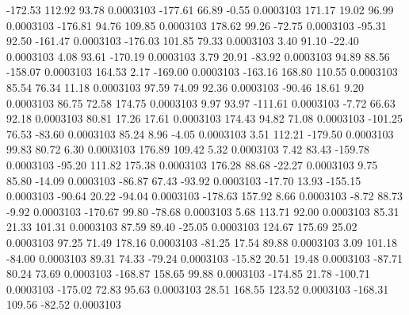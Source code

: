      -172.53      112.92       93.78     0.0003103
     -177.61       66.89       -0.55     0.0003103
      171.17       19.02       96.99     0.0003103
     -176.81       94.76      109.85     0.0003103
      178.62       99.26      -72.75     0.0003103
      -95.31       92.50     -161.47     0.0003103
     -176.03      101.85       79.33     0.0003103
        3.40       91.10      -22.40     0.0003103
        4.08       93.61     -170.19     0.0003103
        3.79       20.91      -83.92     0.0003103
       94.89       88.56     -158.07     0.0003103
      164.53        2.17     -169.00     0.0003103
     -163.16      168.80      110.55     0.0003103
       85.54       76.34       11.18     0.0003103
       97.59       74.09       92.36     0.0003103
      -90.46       18.61        9.20     0.0003103
       86.75       72.58      174.75     0.0003103
        9.97       93.97     -111.61     0.0003103
       -7.72       66.63       92.18     0.0003103
       80.81       17.26       17.61     0.0003103
      174.43       94.82       71.08     0.0003103
     -101.25       76.53      -83.60     0.0003103
       85.24        8.96       -4.05     0.0003103
        3.51      112.21     -179.50     0.0003103
       99.83       80.72        6.30     0.0003103
      176.89      109.42        5.32     0.0003103
        7.42       83.43     -159.78     0.0003103
      -95.20      111.82      175.38     0.0003103
      176.28       88.68      -22.27     0.0003103
        9.75       85.80      -14.09     0.0003103
      -86.87       67.43      -93.92     0.0003103
      -17.70       13.93     -155.15     0.0003103
      -90.64       20.22      -94.04     0.0003103
     -178.63      157.92        8.66     0.0003103
       -8.72       88.73       -9.92     0.0003103
     -170.67       99.80      -78.68     0.0003103
        5.68      113.71       92.00     0.0003103
       85.31       21.33      101.31     0.0003103
       87.59       89.40      -25.05     0.0003103
      124.67      175.69       25.02     0.0003103
       97.25       71.49      178.16     0.0003103
      -81.25       17.54       89.88     0.0003103
        3.09      101.18      -84.00     0.0003103
       89.31       74.33      -79.24     0.0003103
      -15.82       20.51       19.48     0.0003103
      -87.71       80.24       73.69     0.0003103
     -168.87      158.65       99.88     0.0003103
     -174.85       21.78     -100.71     0.0003103
     -175.02       72.83       95.63     0.0003103
       28.51      168.55      123.52     0.0003103
     -168.31      109.56      -82.52     0.0003103
